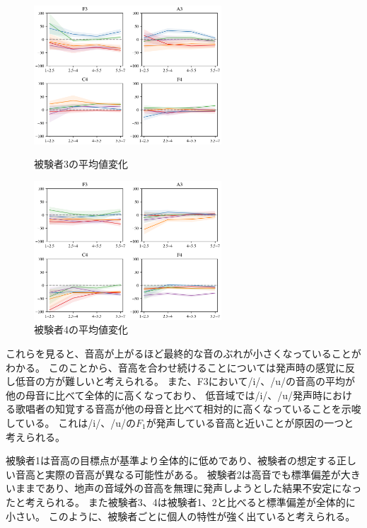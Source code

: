 \documentclass[10.5ptj,a4j,dvipdfmx,uplatex, oneside, openany, report]{jsbook}%
\begin{document}
\begin{figure}[htbp]
    \begin{minipage}{0.5\hsize}
        \begin{center}
            \includegraphics[clip,width=7.0cm]{long_mean_3.png}
          \end{center}
     \caption{被験者3の平均値変化}
     \label{long_mean_3}
    \end{minipage}
    \begin{minipage}{0.5\hsize}
        \begin{center}
            \includegraphics[clip,width=7.0cm]{long_mean_4.png}
          \end{center}
     \caption{被験者4の平均値変化}
     \label{long_mean_4}
    \end{minipage}
\end{figure}

これらを見ると、音高が上がるほど最終的な音のぶれが小さくなっていることがわかる。
このことから、音高を合わせ続けることについては発声時の感覚に反し低音の方が難しいと考えられる。
また、F3において/i/、/u/の音高の平均が他の母音に比べて全体的に高くなっており、
低音域では/i/、/u/発声時における歌唱者の知覚する音高が他の母音と比べて相対的に高くなっていることを示唆している。
これは/i/、/u/の$F_1$が発声している音高と近いことが原因の一つと考えられる。

被験者1は音高の目標点が基準より全体的に低めであり、被験者の想定する正しい音高と実際の音高が異なる可能性がある。
被験者2は高音でも標準偏差が大きいままであり、地声の音域外の音高を無理に発声しようとした結果不安定になったと考えられる。
また被験者3、4は被験者1、2と比べると標準偏差が全体的に小さい。
このように、被験者ごとに個人の特性が強く出ていると考えられる。
\end{document}
